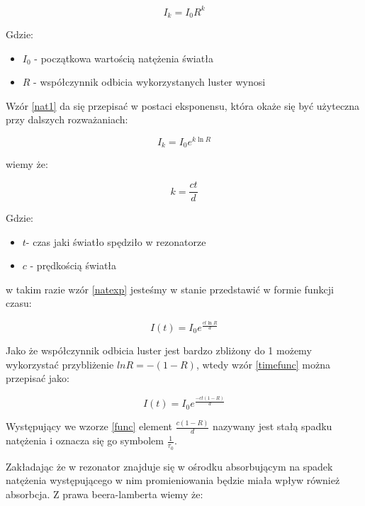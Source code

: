 \documentclass[10pt,a4paper]{article}
\begin{document}
\begin{equation}
    \label{nat1}
    I_k = I_0 R^k
\end{equation}

Gdzie:
\begin{itemize}
    \item $I_0$ - początkowa wartością natężenia światła
    \item $R$ - współczynnik odbicia wykorzystanych luster wynosi
\end{itemize}

Wzór \ref{nat1} da się przepisać w postaci eksponensu, która okaże się być użyteczna przy dalszych rozważaniach:

\begin{equation}
    \label{natexp}
    I_k = I_0 e^{k \ln{R}}
\end{equation}

wiemy że:

\begin{equation}
    \label{kejdef}
    k = \frac{ct}{d}
\end{equation}

Gdzie:
\begin{itemize}
    \item $t$- czas jaki światło spędziło w rezonatorze
    \item $c$ - prędkością światła
\end{itemize}

\newpage

w takim razie wzór \ref{natexp} jesteśmy w stanie przedstawić w formie funkcji czasu:

\begin{equation}
    \label{timefunc}
    I\left(t\right) = I_0 e^{\frac{ct \ln{R}}{d}}
\end{equation}

Jako że współczynnik odbicia luster jest bardzo zbliżony do 1 możemy wykorzystać przybliżenie $lnR = -(1-R)$, wtedy wzór \ref{timefunc} można przepisać jako:

\begin{equation}
    \label{func}
    I(t) = I_0 e^{\frac{-ct(1-R)}{d}}
\end{equation}

Występujący we wzorze \ref{func} element $\frac{c(1-R)}{d}$ nazywany jest stałą spadku natężenia i oznacza się go symbolem $\frac{1}{\tau_0}$.

Zakładając że w rezonator znajduje się w ośrodku absorbującym na spadek natężenia występującego w nim promieniowania będzie miała wpływ również absorbcja. Z prawa beera-lamberta \cite{lasery} wiemy że:
\end{document}
